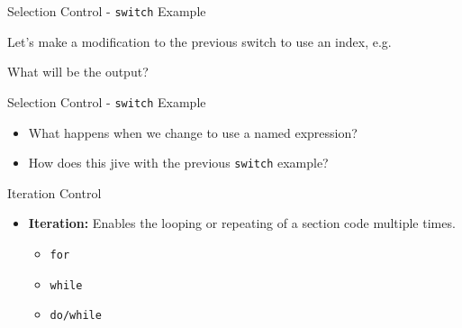 \begin{frame}[fragile]{Selection Control - \texttt{switch} Example}

Let's make a modification to the previous switch to use an index, e.g.

\begin{Shaded}
\begin{Highlighting}[]
        \NormalTok{, }
        \NormalTok{, }
       \NormalTok{)}
\end{Highlighting}
\end{Shaded}

What will be the output?

\end{frame}

\begin{frame}[fragile]{Selection Control - \texttt{switch} Example}

\begin{itemize}
\tightlist
\item
  What happens when we change to use a named expression?
\end{itemize}

\begin{Shaded}
\begin{Highlighting}[]
        \NormalTok{, }
        \NormalTok{, }
       \NormalTok{)}
\end{Highlighting}
\end{Shaded}

\begin{itemize}
\tightlist
\item
  How does this jive with the previous \texttt{switch} example?
\end{itemize}

\end{frame}

\begin{frame}[fragile]{Iteration Control}

\begin{itemize}
\tightlist
\item
  \textbf{Iteration:} Enables the looping or repeating of a section code
  multiple times.

  \begin{itemize}
  \tightlist
  \item
    \texttt{for}
  \item
    \texttt{while}
  \item
    \texttt{do/while}
  \end{itemize}
\end{itemize}

\end{frame}

